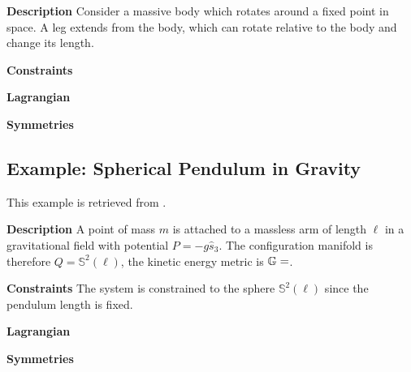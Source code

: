 \documentclass[main.tex]{subfiles}
\begin{document}
\textbf{Description} Consider a massive body which rotates around a fixed point in space. A leg extends from the body, which can rotate relative to the body and change its length.

\textbf{Constraints}

\textbf{Lagrangian}

\textbf{Symmetries}

\subsection{Example: Spherical Pendulum in Gravity}
This example is retrieved from \cite[295]{bullo2019geometric}.%

\textbf{Description} A point of mass $m$ is attached to a massless arm of length $\ell$ in a gravitational field with potential $P=-g\hat{s}_3$. The configuration manifold is therefore $Q=\mathbb{S}^2(\ell)$, the kinetic energy metric is $\mathbb{G}=$.

\textbf{Constraints} The system is constrained to the sphere $\mathbb{S}^2(\ell)$ since the pendulum length is fixed.

\textbf{Lagrangian}

\textbf{Symmetries}
\end{document}
